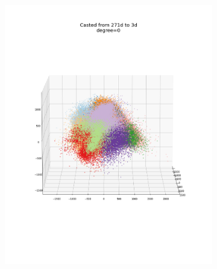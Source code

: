 \documentclass[12pt, a4paper]{article}
\begin{document}
\begin{figure}[h]
    \centering
    \begin{subfigure}{0.3\linewidth}
        \centering
        \includegraphics[width=\linewidth]{images/q4/h/3dangle0.png}
    \end{subfigure}
    \hfill
    \begin{subfigure}{0.3\linewidth}
        \centering

\end{subfigure}
\end{figure}
\end{document}
